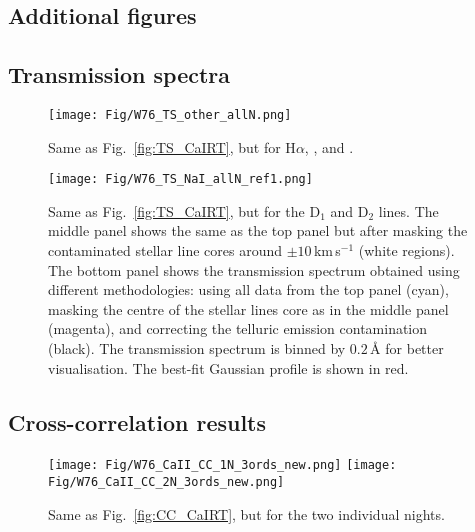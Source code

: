\documentclass{aa}
\begin{document}



\onecolumn
\begin{appendix} %

\section{Additional figures}
\label{app:addfig}



\subsection{Transmission spectra}

\begin{figure*}[h]
\centering
\texttt{[image: Fig/W76\_TS\_other\_allN.png]}
\caption{Same as Fig.~\ref{fig:TS_CaIRT}, but for H$\alpha$, , and .}
\label{fig:revis_res}
\end{figure*}



\begin{figure}[h]
\centering
\texttt{[image: Fig/W76\_TS\_NaI\_allN\_ref1.png]}
\caption{Same as Fig.~\ref{fig:TS_CaIRT}, but for the  D$_1$ and D$_2$ lines. The middle panel shows the same as the top panel but after masking the contaminated stellar line cores around $\pm10$\,km\,s$^{-1}$ (white regions). The bottom panel shows the transmission spectrum obtained using different methodologies: using all data from the top panel (cyan), masking the centre of the stellar  lines core as in the middle panel (magenta), and correcting the telluric  emission contamination (black). The transmission spectrum is binned by $0.2$\,{\AA} for better visualisation. The best-fit Gaussian profile is shown in red.}
\label{fig:ts_NaI}
\end{figure}

\clearpage

\subsection{Cross-correlation results}

\begin{figure*}[h]
\centering
\texttt{[image: Fig/W76\_CaII\_CC\_1N\_3ords\_new.png]}
\texttt{[image: Fig/W76\_CaII\_CC\_2N\_3ords\_new.png]}
\caption{Same as Fig.~\ref{fig:CC_CaIRT}, but for the two individual nights.}
\label{fig:cc_Ca_ind}
\end{figure*}


\end{appendix}
\end{document}
